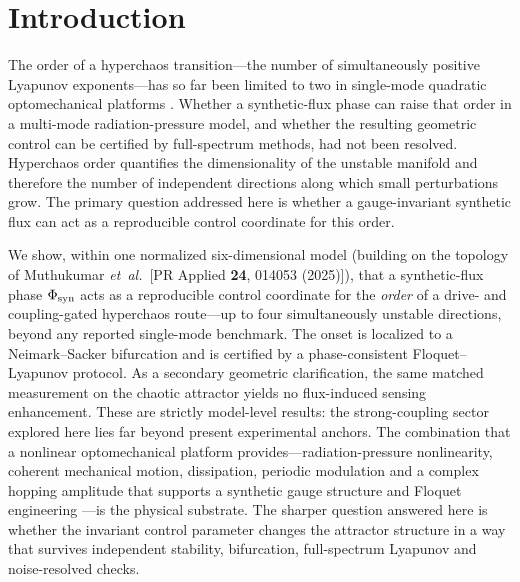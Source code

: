 \documentclass[Phys]{SciPost}
\begin{document}
\thispagestyle{fancy}\section{Introduction}

The order of a hyperchaos transition---the number of simultaneously positive Lyapunov exponents---has so far been limited to two in single-mode quadratic optomechanical platforms \cite{HalefShomroni2025}. Whether a synthetic-flux phase can raise that order in a multi-mode radiation-pressure model, and whether the resulting geometric control can be certified by full-spectrum methods, had not been resolved. Hyperchaos order quantifies the dimensionality of the unstable manifold and therefore the number of independent directions along which small perturbations grow. The primary question addressed here is whether a gauge-invariant synthetic flux can act as a reproducible control coordinate for this order.

We show, within one normalized six-dimensional model (building on the topology of Muthukumar \emph{et~al.}~[PR Applied \textbf{24}, 014053 (2025)]), that a synthetic-flux phase $\Phi_{\rm syn}$ acts as a reproducible control coordinate for the \emph{order} of a drive- and coupling-gated hyperchaos route---up to four simultaneously unstable directions, beyond any reported single-mode benchmark. The onset is localized to a Neimark--Sacker bifurcation and is certified by a phase-consistent Floquet--Lyapunov protocol. As a secondary geometric clarification, the same matched measurement on the chaotic attractor yields no flux-induced sensing enhancement. These are strictly model-level results: the strong-coupling sector explored here lies far beyond present experimental anchors. The combination that a nonlinear optomechanical platform provides---radiation-pressure nonlinearity, coherent mechanical motion, dissipation, periodic modulation and a complex hopping amplitude that supports a synthetic gauge structure \cite{aspelmeyer2014,kippenberg2008,marquardt2006,carmon2007,alphonse2022} and Floquet engineering \cite{oka2009,goldman2014,bukov2015,kitagawa2010,peano2015,sanavio2020}---is the physical substrate. The sharper question answered here is whether the invariant control parameter changes the attractor structure in a way that survives independent stability, bifurcation, full-spectrum Lyapunov and noise-resolved checks.
\end{document}
